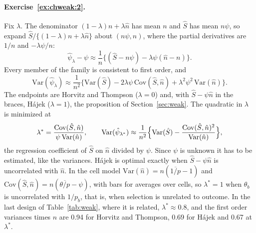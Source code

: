 \paragraph{Exercise~\ref{ex:chweak:2}.} Fix $\lambda$. The denominator $(1 - \lambda)n + \lambda\hat n$ has mean $n$ and $\hat S$ has mean $n\psi$, so expand $\hat S/\{(1 - \lambda)n + \lambda\hat n\}$ about $(n\psi, n)$, where the partial derivatives are $1/n$ and $-\lambda\psi/n$:
\[
\hat\psi_\lambda - \psi \approx \frac{1}{n}\bigl\{(\hat S - n\psi) - \lambda\psi(\hat n - n)\bigr\}.
\]
Every member of the family is consistent to first order, and
\[
\mathrm{Var}(\hat\psi_\lambda) \approx \frac{1}{n^2}\bigl\{\mathrm{Var}(\hat S) - 2\lambda\psi\,\mathrm{Cov}(\hat S, \hat n) + \lambda^2\psi^2\,\mathrm{Var}(\hat n)\bigr\}.
\]
The endpoints are Horvitz and Thompson ($\lambda = 0$) and, with $\hat S - \psi\hat n$ in the braces, H\'ajek ($\lambda = 1$), the proposition of Section~\ref{sec:weak}. The quadratic in $\lambda$ is minimized at
\[
\lambda^* = \frac{\mathrm{Cov}(\hat S, \hat n)}{\psi\,\mathrm{Var}(\hat n)}, \qquad \mathrm{Var}(\hat\psi_{\lambda^*}) \approx \frac{1}{n^2}\Bigl\{\mathrm{Var}(\hat S) - \frac{\mathrm{Cov}(\hat S, \hat n)^2}{\mathrm{Var}(\hat n)}\Bigr\},
\]
the regression coefficient of $\hat S$ on $\hat n$ divided by $\psi$. Since $\psi$ is unknown it has to be estimated, like the variances. H\'ajek is optimal exactly when $\hat S - \psi\hat n$ is uncorrelated with $\hat n$. In the cell model $\mathrm{Var}(\hat n) = n(\overline{1/p} - 1)$ and $\mathrm{Cov}(\hat S, \hat n) = n(\overline{\theta/p} - \psi)$, with bars for averages over cells, so $\lambda^* = 1$ when $\theta_b$ is uncorrelated with $1/p_b$, that is, when selection is unrelated to outcome. In the last design of Table~\ref{tab:weak}, where it is related, $\lambda^* \approx 0.8$, and the first order variances times $n$ are 0.94 for Horvitz and Thompson, 0.69 for H\'ajek and 0.67 at $\lambda^*$.

